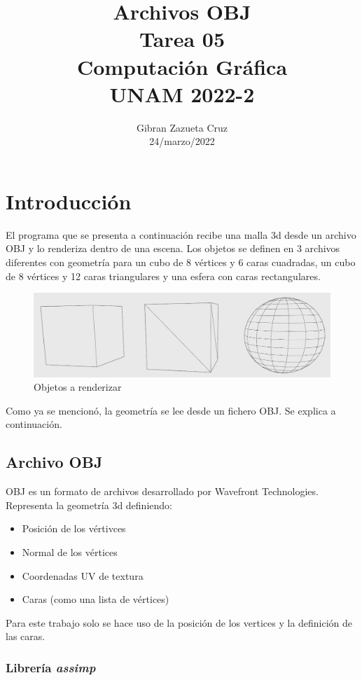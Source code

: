 \documentclass[12pt]{article}
\title{%
  Archivos OBJ\\
  \large Tarea 05 \\
    \Large Computación Gráfica\\
     \large UNAM 2022-2}
\author{Gibran Zazueta Cruz \\
\small 24/marzo/2022}
\date{}
\begin{document}
\maketitle

\section{Introducción}

El programa que se presenta a continuación recibe una malla 3d desde un archivo OBJ y lo renderiza dentro de una escena. Los objetos se definen en 3 archivos diferentes con geometría para un cubo de 8 vértices y 6 caras cuadradas, un cubo de 8 vértices y 12 caras triangulares y una esfera con caras rectangulares.

\begin{figure}[H]
\centering
\includegraphics[scale=0.3]{images/objetos.png}
\caption{Objetos a renderizar}
\end{figure}


Como ya se mencionó, la geometría se lee desde un fichero OBJ. Se explica a continuación.

\subsection{Archivo OBJ}

OBJ es un formato de archivos desarrollado por Wavefront Technologies. Representa la geometría 3d definiendo:

\begin{itemize}
\item Posición de los vértivces
\item Normal de los vértices
\item Coordenadas UV de textura
\item Caras (como una lista de vértices)
\end{itemize}


Para este trabajo solo se hace uso de la posición de los vertices y la definición de las caras.


\subsubsection{Librería \textit{assimp}}
\end{document}
